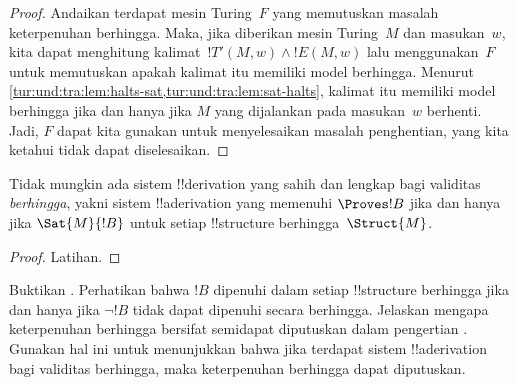 \documentclass[../../../include/open-logic-section]{subfiles}
\begin{document}
\begin{proof}
  Andaikan terdapat mesin Turing~$F$ yang memutuskan masalah keterpenuhan
  berhingga. Maka, jika diberikan mesin Turing~$M$ dan masukan~$w$, kita dapat
  menghitung kalimat~$!T'(M,w) \land !E(M,w)$ lalu menggunakan~$F$ untuk
  memutuskan apakah kalimat itu memiliki model berhingga. Menurut
  \cref{tur:und:tra:lem:halts-sat,tur:und:tra:lem:sat-halts}, kalimat itu
  memiliki model berhingga jika dan hanya jika $M$ yang dijalankan pada
  masukan~$w$ berhenti. Jadi, $F$ dapat kita gunakan untuk menyelesaikan
  masalah penghentian, yang kita ketahui tidak dapat diselesaikan.
\end{proof}

\begin{cor}%
  Tidak mungkin ada sistem !!{derivation} yang sahih dan lengkap bagi
  validitas \emph{berhingga}, yakni sistem !!a{derivation} yang memenuhi
  $\Proves !B$ jika dan hanya jika $\Sat{M}{!B}$ untuk setiap
  !!{structure} berhingga~$\Struct{M}$.
\end{cor}

\begin{proof}
  Latihan.
\end{proof}

\begin{prob}
  Buktikan . Perhatikan bahwa $!B$
  dipenuhi dalam setiap !!{structure} berhingga jika dan hanya jika
  $\lnot !B$ tidak dapat dipenuhi secara berhingga. Jelaskan mengapa
  keterpenuhan berhingga bersifat semidapat diputuskan dalam pengertian
  . Gunakan hal ini untuk menunjukkan bahwa
  jika terdapat sistem !!a{derivation} bagi validitas berhingga, maka
  keterpenuhan berhingga dapat diputuskan.
\end{prob}
\end{document}
